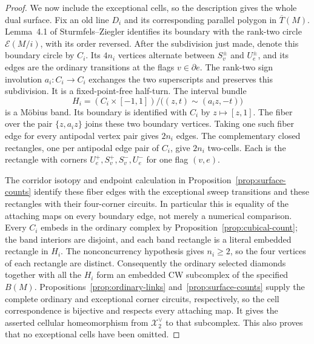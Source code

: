 \begin{proof}
We now include the exceptional cells, so the description gives the whole
dual surface. Fix an old line $D_i$ and its corresponding parallel
polygon in $\overline T(M)$. Lemma~4.1 of Sturmfels--Ziegler identifies
its boundary with the rank-two circle $\mathcal E(M/i)$, with its order
reversed. After the subdivision just made, denote this boundary circle
by $C_i$. Its $4n_i$ vertices alternate between $S_v^\pm$ and $U_e^\pm$,
and its edges are the ordinary transitions at the flags $v\in\partial e$.
The rank-two sign involution $a_i:C_i\to C_i$ exchanges the two superscripts
and preserves this subdivision. It is a fixed-point-free half-turn.
The interval bundle
\[
 H_i=(C_i\times[-1,1])/\bigl((z,t)\sim(a_i z,-t)\bigr)
\]
is a M\"obius band. Its boundary is identified with $C_i$ by
$z\mapsto[z,1]$. The fiber over the pair $\{z,a_i z\}$ joins these two
boundary vertices. Taking one such fiber edge for every antipodal
vertex pair gives $2n_i$ edges. The complementary closed rectangles,
one per antipodal edge pair of $C_i$, give $2n_i$ two-cells. Each is
the rectangle with corners
$U_e^+,S_v^+,S_v^-,U_e^-$ for one flag $(v,e)$.

The corridor isotopy and endpoint calculation in Proposition~\ref{prop:surface-counts} identify these
fiber edges with the exceptional sweep transitions and these rectangles
with their four-corner circuits. In particular this is equality of
the attaching maps on every boundary edge, not merely a numerical
comparison. Every $C_i$ embeds in the ordinary complex by Proposition~\ref{prop:cubical-count}; the band
interiors are disjoint, and each band rectangle is a literal embedded
rectangle in $H_i$. The nonconcurrency hypothesis gives $n_i\geq2$, so
the four vertices of each rectangle are distinct. Consequently the
ordinary selected diamonds together with all the $H_i$ form an embedded
CW subcomplex of the specified $B(M)$. Propositions~\ref{prop:ordinary-links} and~\ref{prop:surface-counts} supply the complete
ordinary and exceptional corner circuits, respectively, so the cell
correspondence is bijective and respects every attaching map. It gives
the asserted cellular homeomorphism from $\mathcal X_2^\vee$ to that
subcomplex. This also proves that no exceptional cells have been omitted.


\end{proof}
